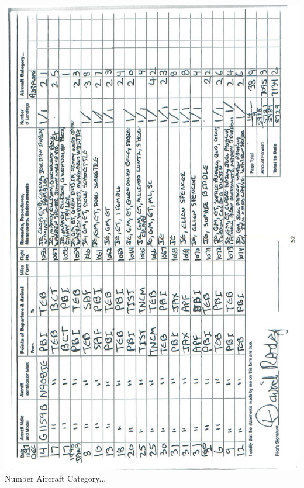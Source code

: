 \documentclass[10pt]{article}
\begin{document}
\includegraphics[max width=\textwidth, center]{2025_02_27_dd68c3d38de88f0516d9g-056}\\
Number Aircraft Category...\\
\end{document}

